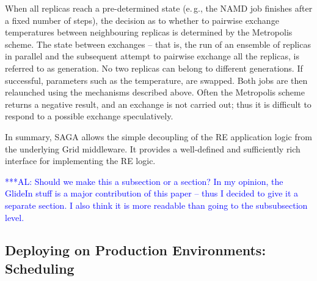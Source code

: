 \documentclass{rspublic}
\newcommand{\alnote}[1]{ {\textcolor{blue} { ***AL: #1 }}}
\newcommand{\alnote}[1]{}
\newcommand{\remanager}[1]{RE-Manager }
\begin{document}
When all replicas reach a pre-determined state (e.\,g., the NAMD job
finishes after a fixed number of steps), the decision as to whether to
pairwise exchange temperatures between neighbouring replicas is
determined by the Metropolis scheme.%
The state between exchanges -- that is, the run of an ensemble of replicas
in parallel and the subsequent attempt to pairwise exchange all the
replicas, is referred to as generation. No two replicas can belong to
different generations.  If successful, parameters such as the
temperature, are swapped. Both jobs are then relaunched using the
mechanisms described above. Often the Metropolis scheme returns a
negative result, and an exchange is not carried out; thus it is
difficult to respond to a possible exchange speculatively.

In summary, SAGA allows the simple decoupling of the RE application
logic from the underlying Grid middleware. It provides a well-defined
and sufficiently rich interface for implementing the RE
logic.%



\alnote{Should we make this a subsection or a section? In my opinion,
the GlideIn stuff is a major contribution of this paper -- thus I decided to
give it a separate section. I also think it is more readable than going to the
subsubsection level.}           

\subsection{Deploying on Production Environments: Scheduling}
\end{document}
